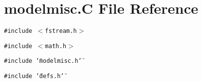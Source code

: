 \section{modelmisc.C File Reference}
\label{modelmisc_C}
{\tt \#include $<$fstream.h$>$}\par
{\tt \#include $<$math.h$>$}\par
{\tt \#include \char`\"{}modelmisc.h\char`\"{}}\par
{\tt \#include \char`\"{}defs.h\char`\"{}}\par

